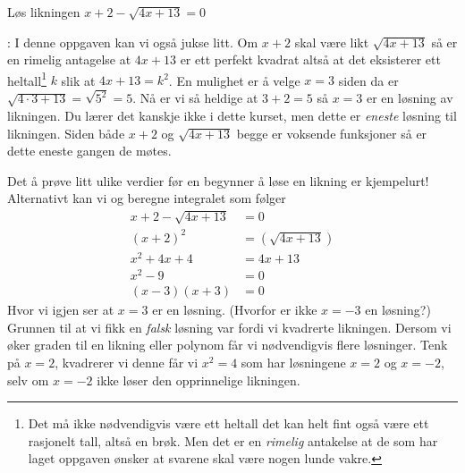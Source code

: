 \documentclass[a4paper,11pt]{article}
\begin{document}
\newpageLF

\begin{problem}
  \label{problem:1.9-5-oving-02-2019-MAT-0001}
  Løs likningen $x + 2 - \sqrt{4x + 13} = 0$ 
\end{problem}

\begin{solution}
  : I denne oppgaven kan vi også jukse
  litt. Om $x + 2$ skal være likt $\sqrt{4x + 13}$ så er en rimelig antagelse at
  $4x + 13$ er ett perfekt kvadrat altså at det eksisterer ett
  heltall\footnote{Det må ikke nødvendigvis være ett heltall det kan helt fint
  også være ett rasjonelt tall, altså en brøk. Men det er en \emph{rimelig}
  antakelse at de som har laget oppgaven ønsker at svarene skal være nogen lunde
  vakre.} $k$ slik at $4x+13=k^2$. En mulighet er å velge $x=3$ siden da er
  $\sqrt{4\cdot 3 + 13} = \sqrt{5^2} = 5$. Nå er vi så heldige at $3 + 2 = 5$ så
  $x = 3$ er en løsning av likningen. Du lærer det kanskje ikke i dette kurset,
  men dette er \emph{eneste} løsning til likningen. Siden både $x + 2$ og
  $\sqrt{4x + 13}$ begge er voksende funksjoner så er dette eneste gangen de
  møtes. \medskip

  Det å prøve litt ulike verdier før en begynner å løse en likning er
  kjempelurt! Alternativt kan vi og beregne integralet som følger
  \begin{align*}
    x + 2 - \sqrt{4x + 13} &= 0 \\ 
    (x + 2)^2  &= (\sqrt{4x + 13}) \\ 
    x^2 + 4x + 4 &= 4x + 13 \\
    x^2 - 9 &= 0 \\
    (x - 3)(x + 3) &= 0
  \end{align*}
  Hvor vi igjen ser at $x = 3$ er en løsning. (Hvorfor er ikke $x = -3$ en
  løsning?) Grunnen til at vi fikk en \emph{falsk} løsning var fordi vi
  kvadrerte likningen. Dersom vi øker graden til en likning eller polynom får vi
  nødvendigvis flere løsninger. Tenk på $x = 2$, kvadrerer vi denne får vi $x^2
  = 4$ som har løsningene $x = 2$ og $x = -2$, selv om $x = -2$ ikke løser den
  opprinnelige likningen.
\end{solution}
\end{document}

